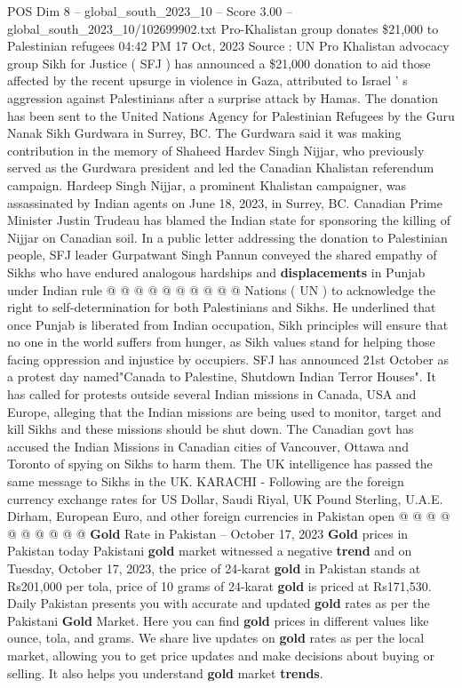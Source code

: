 \begin{textsample}{POS Dim 8 – global\_south\_2023\_10 – Score 3.00 – global\_south\_2023\_10/102699902.txt}  \label{ex:f8_pos_359}
Pro-Khalistan group donates \$21,000 to Palestinian refugees 04:42 PM 17 Oct, 2023 Source : UN Pro Khalistan advocacy group Sikh for Justice ( SFJ ) has announced a \$21,000 donation to aid those affected by the recent upsurge in violence in Gaza, attributed to Israel ' s aggression against Palestinians after a surprise attack by Hamas.
The donation has been sent to the United Nations Agency for Palestinian Refugees by the Guru Nanak Sikh Gurdwara in Surrey, BC.
The Gurdwara said it was making contribution in the memory of Shaheed Hardev Singh Nijjar, who previously served as the Gurdwara president and led the Canadian Khalistan referendum campaign.
Hardeep Singh Nijjar, a prominent Khalistan campaigner, was assassinated by Indian agents on June 18, 2023, in Surrey, BC.
Canadian Prime Minister Justin Trudeau has blamed the Indian state for sponsoring the killing of Nijjar on Canadian soil.
In a public letter addressing the donation to Palestinian people, SFJ leader Gurpatwant Singh Pannun conveyed the shared empathy of Sikhs who have endured analogous hardships and \textbf{displacements} in Punjab under Indian rule @ @ @ @ @ @ @ @ @ @ Nations ( UN ) to acknowledge the right to self-determination for both Palestinians and Sikhs.
He underlined that once Punjab is liberated from Indian occupation, Sikh principles will ensure that no one in the world suffers from hunger, as Sikh values stand for helping those facing oppression and injustice by occupiers.
SFJ has announced 21st October as a protest day named"Canada to Palestine, Shutdown Indian Terror Houses".
It has called for protests outside several Indian missions in Canada, USA and Europe, alleging that the Indian missions are being used to monitor, target and kill Sikhs and these missions should be shut down.
The Canadian govt has accused the Indian Missions in Canadian cities of Vancouver, Ottawa and Toronto of spying on Sikhs to harm them.
The UK intelligence has passed the same message to Sikhs in the UK.
KARACHI - Following are the foreign currency exchange rates for US Dollar, Saudi Riyal, UK Pound Sterling, U.A.E.
Dirham, European Euro, and other foreign currencies in Pakistan open @ @ @ @ @ @ @ @ @ @ \textbf{Gold} Rate in Pakistan -- October 17, 2023 \textbf{Gold} prices in Pakistan today Pakistani \textbf{gold} market witnessed a negative \textbf{trend} and on Tuesday, October 17, 2023, the price of 24-karat \textbf{gold} in Pakistan stands at Rs201,000 per tola, price of 10 grams of 24-karat \textbf{gold} is priced at Rs171,530.
Daily Pakistan presents you with accurate and updated \textbf{gold} rates as per the Pakistani \textbf{Gold} Market.
Here you can find \textbf{gold} prices in different values like ounce, tola, and grams.
We share live updates on \textbf{gold} rates as per the local market, allowing you to get price updates and make decisions about buying or selling.
It also helps you understand \textbf{gold} market \textbf{trends}.

\end{textsample}
